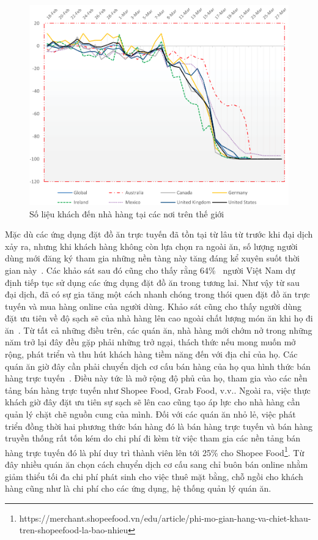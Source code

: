 \begin{figure}[h]
	\centering
	\includegraphics[width=\textwidth]{images/hChip/state-of-global-restaurant-industry-2020.png}
	\caption{Số liệu khách đến nhà hàng tại các nơi trên thế giới~\cite{dube2021covid}}
	\label{fig:state-of-global-restaurant-industry-2020}
\end{figure}

Mặc dù các ứng dụng đặt đồ ăn trực tuyến đã tồn tại từ lâu từ trước khi đại dịch xảy ra, nhưng khi khách hàng không còn lựa chọn ra ngoài ăn, số lượng người dùng mới đăng ký tham gia những nền tàng này tăng đáng kể xuyên suốt thời gian này~\cite{hoang2021customer}.
Các khảo sát sau đó cũng cho thấy rằng 64\%~\cite{pham2020study} người Việt Nam dự định tiếp tục sử dụng các ứng dụng đặt đồ ăn trong tương lai.
Như vậy từ sau đại dịch, đã có sự gia tăng một cách nhanh chóng trong thói quen đặt đồ ăn trực tuyến và mua hàng online của người dùng.
Khảo sát cũng cho thấy người dùng đặt ưu tiên về độ sạch sẽ của nhà hàng lên cao ngoài chất lượng món ăn khi họ đi ăn~\cite{hoang2021customer}.
Từ tất cả những điều trên, các quán ăn, nhà hàng mới chớm nở trong những năm trở lại đây đều gặp phải những trở ngại, thách thức nếu mong muốn mở rộng, phát triển và thu hút khách hàng tiềm năng đến với địa chỉ của họ.
Các quán ăn giờ đây cần phải chuyển dịch cơ cấu bán hàng của họ qua hình thức bán hàng trực tuyến~\cite{matsenko2021transformation}.
Điều này tức là mở rộng độ phủ của họ, tham gia vào các nền tảng bán hàng trực tuyến như Shopee Food, Grab Food, v.v..
Ngoài ra, việc thực khách giờ đây đặt ưu tiên sự sạch sẽ lên cao cũng tạo áp lực cho nhà hàng cần quản lý chặt chẽ nguồn cung của mình.
Đối với các quán ăn nhỏ lẻ, việc phát triển đồng thời hai phương thức bán hàng đó là bán hàng trực tuyến và bán hàng truyền thống rất tốn kém do chi phí đi kèm từ việc tham gia các nền tảng bán hàng trực tuyến đó là phí duy trì thành viên lên tới 25\% cho Shopee Food\footnote{https://merchant.shopeefood.vn/edu/article/phi-mo-gian-hang-va-chiet-khau-tren-shopeefood-la-bao-nhieu}.
Từ đây nhiều quán ăn chọn cách chuyển dịch cơ cấu sang chỉ buôn bán online nhằm giảm thiểu tối đa chi phí phát sinh cho việc thuê mặt bằng, chỗ ngồi cho khách hàng cũng như là chi phí cho các ứng dụng, hệ thống quản lý quán ăn.


